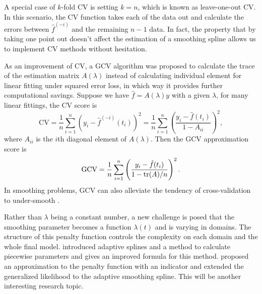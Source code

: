 A special case of $k$-fold CV is setting $k=n$, which is known as leave-one-out CV. In this scenario, the CV function takes each of the data out and calculate the errors between $\hat{f}^{(-i)}$ and the remaining $n-1$ data. In fact, the property that by taking one point out doesn't affect the estimation of a smoothing spline allows us to implement CV methods without hesitation. 

As an improvement of CV, a GCV algorithm was proposed to calculate the trace of the estimation matrix $A(\lambda)$ instead of calculating individual element for linear fitting under squared error loss, in which way it provides further computational savings. Suppose we have $\hat{f}=A(\lambda)y$ with a given $\lambda$, for many linear fittings, the CV score is 
\begin{equation*}
\mbox{CV} = \frac{1}{n}\sum_{i=1}^{n} \left( y_i - \hat{f}^{(-i)}(t_i)\right)^2 = \frac{1}{n} \sum_{i=1}^{n}\left( \frac{y_i-\hat{f}(t_i)}{1-A_{ii}}  \right)^2, 
\end{equation*}
where $A_{ii}$ is the $i$th diagonal element of $A(\lambda)$. Then the GCV approximation score is 
\begin{equation*}
\mbox{GCV} =\frac{1}{n} \sum_{i=1}^{n}\left( \frac{y_i-\hat{f}(t_i)}{1-\mathrm{tr}(A)/n}  \right)^2.
\end{equation*}
In smoothing problems, GCV can also alleviate the tendency of cross-validation to under-smooth \cite{esl2009}. 


%


Rather than $\lambda$ being a constant number, a new challenge is posed that the smoothing parameter becomes a function $\lambda(t)$ and is varying in domains. The structure of this penalty function controls the complexity on each domain and the whole final model.  \cite{donoho1995wavelet} introduced adaptive splines and a method to calculate piecewise parameters and \cite{liu2010data} gives an improved formula for this method. \cite{liu2010data} proposed an approximation to the penalty function with an indicator and extended the generalized likelihood to the adaptive smoothing spline. This will be another interesting research topic. 





